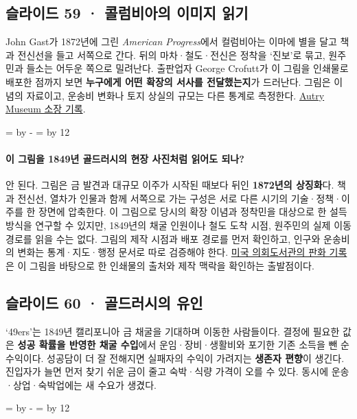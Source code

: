 \documentclass[10pt,a4paper]{article}
\newcommand{\ReserveQuestionSpace}{%
  \par\begingroup
  \dimen0=\pagegoal \advance\dimen0 by -\pagetotal
  \dimen2=\baselineskip \multiply\dimen2 by 12
  \ifdim\dimen0<\dimen2 \newpage\fi
  \endgroup}
\begin{document}
\subsection{슬라이드 59 · 콜럼비아의 이미지 읽기}
John Gast가 1872년에 그린 \emph{American Progress}에서 컬럼비아는 이마에 별을 달고 책과 전신선을 들고 서쪽으로 간다. 뒤의 마차·철도·전신은 정착을 ‘진보’로 묶고, 원주민과 들소는 어두운 쪽으로 밀려난다. 출판업자 George Crofutt가 이 그림을 인쇄물로 배포한 점까지 보면 \textbf{누구에게 어떤 확장의 서사를 전달했는지}가 드러난다. 그림은 이념의 자료이고, 운송비 변화나 토지 상실의 규모는 다른 통계로 측정한다. \href{https://collections.theautry.org/mwebcgi/mweb.exe?request=record\%3Bid\%3DM545330\%3Btype\%3D101}{Autry Museum 소장 기록}.\par

\ReserveQuestionSpace
\paragraph{이 그림을 1849년 골드러시의 현장 사진처럼 읽어도 되나?}
안 된다. 그림은 금 발견과 대규모 이주가 시작된 때보다 뒤인 \textbf{1872년의 상징화}다. 책과 전신선, 열차가 인물과 함께 서쪽으로 가는 구성은 서로 다른 시기의 기술·정책·이주를 한 장면에 압축한다. 이 그림으로 당시의 확장 이념과 정착민을 대상으로 한 설득 방식을 연구할 수 있지만, 1849년의 채굴 인원이나 철도 도착 시점, 원주민의 실제 이동 경로를 읽을 수는 없다. 그림의 제작 시점과 배포 경로를 먼저 확인하고, 인구와 운송비의 변화는 통계·지도·행정 문서로 따로 검증해야 한다. \href{https://www.loc.gov/resource/cph.3a04647/?st=list}{미국 의회도서관의 판화 기록}은 이 그림을 바탕으로 한 인쇄물의 출처와 제작 맥락을 확인하는 출발점이다.\par

\subsection{슬라이드 60 · 골드러시의 유인}
‘49ers’는 1849년 캘리포니아 금 채굴을 기대하며 이동한 사람들이다. 결정에 필요한 값은 \textbf{성공 확률을 반영한 채굴 수입}에서 운임·장비·생활비와 포기한 기존 소득을 뺀 순수익이다. 성공담이 더 잘 전해지면 실패자의 수익이 가려지는 \textbf{생존자 편향}이 생긴다. 진입자가 늘면 먼저 찾기 쉬운 금이 줄고 숙박·식량 가격이 오를 수 있다. 동시에 운송·상업·숙박업에는 새 수요가 생겼다.\par

\ReserveQuestionSpace
\end{document}
